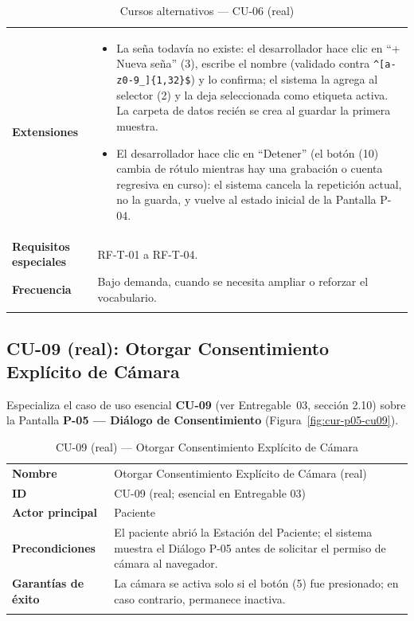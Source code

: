 \begin{longtable}{@{}p{4.1cm} >{\raggedright\arraybackslash}p{11.2cm}@{}}
\toprule
\textbf{Extensiones} &
\begin{itemize}[leftmargin=*, itemsep=2pt]
    \item[1a.] La seña todavía no existe: el desarrollador hace clic en
    ``+ Nueva seña'' (3), escribe el nombre (validado contra
    \texttt{\^{}[a-z0-9\_]\{1,32\}\$}) y lo confirma; el sistema la
    agrega al selector (2) y la deja seleccionada como etiqueta activa.
    La carpeta de datos recién se crea al guardar la primera muestra.
    \item[5a.] El desarrollador hace clic en ``Detener'' (el botón (10)
    cambia de rótulo mientras hay una grabación o cuenta regresiva en
    curso): el sistema cancela la repetición actual, no la guarda, y
    vuelve al estado inicial de la Pantalla P-04.
\end{itemize} \\
\textbf{Requisitos especiales} & RF-T-01 a RF-T-04. \\
\textbf{Frecuencia} &
Bajo demanda, cuando se necesita ampliar o reforzar el vocabulario. \\
\bottomrule
\caption{Cursos alternativos --- CU-06 (real)}
\end{longtable}

\subsection{CU-09 (real): Otorgar Consentimiento Explícito de Cámara}

Especializa el caso de uso esencial \textbf{CU-09} (ver Entregable~03,
sección 2.10) sobre la Pantalla \textbf{P-05 --- Diálogo de
Consentimiento} (Figura~\ref{fig:cur-p05-cu09}).


\begin{longtable}{@{}p{4.1cm} >{\raggedright\arraybackslash}p{11.2cm}@{}}
\toprule
\textbf{Nombre} & Otorgar Consentimiento Explícito de Cámara (real) \\
\textbf{ID} & CU-09 (real; esencial en Entregable 03) \\
\textbf{Actor principal} & Paciente \\
\textbf{Precondiciones} &
El paciente abrió la Estación del Paciente; el sistema muestra el
Diálogo P-05 antes de solicitar el permiso de cámara al navegador. \\
\textbf{Garantías de éxito} &
La cámara se activa solo si el botón (5) fue presionado; en caso
contrario, permanece inactiva. \\
\bottomrule
\caption{CU-09 (real) — Otorgar Consentimiento Explícito de Cámara}
\end{longtable}

